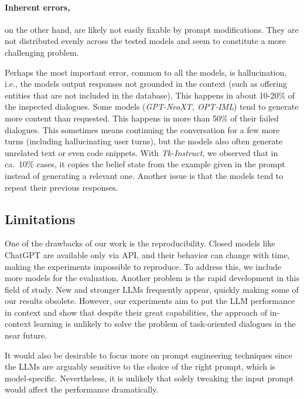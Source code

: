 \paragraph{Inherent errors,} on the other hand, are likely not easily fixable by prompt modifications.
They are not distributed evenly across the tested models and seem to constitute a more challenging problem.

Perhaps the most important error, common to all the models, is hallucination, i.e., the models output responses not grounded in the context (such as offering entities that are not included in the database). This happens in about 10-20\% of the inspected dialogues.
Some models (\emph{GPT-NeoXT, OPT-IML}) tend to generate more content than requested.
This happens in more than 50\% of their failed dialogues.
This sometimes means continuing the conversation for a few more turns (including hallucinating user turns), but the models also often generate unrelated text or even code snippets.
With \emph{Tk-Instruct}, we observed that in ca.~10\% cases, it copies the belief state from the example given in the prompt instead of generating a relevant one.
Another issue is that the models tend to repeat their previous responses.

\subsection{Limitations}
One of the drawbacks of our work is the reproducibility.
Closed models like ChatGPT are available only via API, and their behavior can change with time, making the experiments impossible to reproduce.
To address this, we include more models for the evaluation.
Another problem is the rapid development in this field of study.
New and stronger LLMs frequently appear, quickly making some of our results obsolete.
However, our experiments aim to put the LLM performance in context and show that despite their great capabilities, the approach of in-context learning is unlikely to solve the problem of task-oriented dialogues in the near future.

It would also be desirable to focus more on prompt engineering techniques since the LLMs are arguably sensitive to the choice of the right prompt, which is model-specific.
Nevertheless, it is unlikely that solely tweaking the input prompt would affect the performance dramatically.

